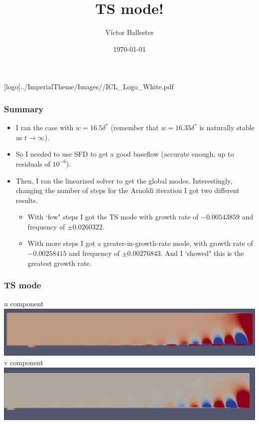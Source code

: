 \documentclass[
	aspectratio=169, %
	t, %
	onlytextwidth, %
	10pt, %
]{beamer}
\title{TS mode!} %
\subtitle{} %
\author{Víctor Ballester} %
\date{\today} %
\def\imagefolder{../ImperialTheme/Images/}
\begin{document}
\begingroup
{} %
[logo]{\imagefolder/ICL_Logo_White.pdf} %
\frame[plain, s]{\titlepage} %
\endgroup

\begin{frame}
	\frametitle{Summary}
	\begin{itemize}
		\item I ran the case with $w=16.5 \delta^*$ (remember that $w=16.35 \delta^*$ is naturally stable as $t\to\infty$).
		\item So I needed to use SFD to get a good baseflow (accurate enough, up to residuals of $10^{-6}$).
		\item Then, I ran the linearized solver to get the global modes. Interestingly, changing the number of steps for the Arnoldi iteration I got two different results. 
		\begin{itemize}
			\item With `few" steps I got the TS mode with growth rate of $-0.00543859$ and frequency of $\pm 0.0260322$.
			\item With more steps I got a greater-in-growth-rate mode, with growth rate of $-0.00258415$ and frequency of $\pm 0.00276843$. And I `showed" this is the greatest growth rate.
		\end{itemize}
	\end{itemize}
        
\end{frame}
\begin{frame}
	\frametitle{TS mode}
	{
	u component
	\centering
	\includegraphics[width=\linewidth]{Images/TSu.png}
	v component
	\includegraphics[width=\linewidth]{Images/TSv.png}
	}
\end{frame}
\end{document}
